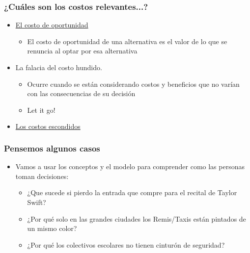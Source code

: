 \documentclass{beamer}
\begin{document}
\begin{frame}
\frametitle{¿Cuáles son los costos relevantes...? }
\begin{itemize}
    \item  \href{https://econ.video/2017/08/28/the-simpsons-opportunity-cost-of-lines/}{El costo de oportunidad}
    \begin{itemize}
        \item El costo de oportunidad de una alternativa es el valor de lo que se renuncia al optar por esa alternativa
    \end{itemize}
    \vspace{2mm}
    \item La falacia del costo hundido.  
    \begin{itemize}
        \item Ocurre cuando se están considerando costos y beneficios que no varían con las consecuencias de su decisión
        \item Let it go!
    \end{itemize}
    \vspace{2mm}
    \item \href{https://www.goodfood.com.au/eat-out/good-food-guides/the-surprising-costs-of-running-a-restaurant-20180327-h0y23c}{Los costos escondidos} 
    \vspace{2mm}
\end{itemize} 
\end{frame}

\begin{frame}
\frametitle{Pensemos algunos casos}
\begin{itemize}
    \item Vamos a usar los conceptos y el modelo para comprender como las personas toman decisiones: \vspace{2mm}
    \begin{itemize} 
    \item ¿Que sucede si pierdo la entrada que compre para el recital de Taylor Swift? \vspace{2mm}
    \item ¿Por qué solo en las grandes ciudades los Remis/Taxis están pintados de un mismo color? \vspace{2mm}
    \item ¿Por qué los colectivos escolares no tienen cinturón de seguridad? 
    \end{itemize}
\end{itemize} 
\end{frame}
\end{document}
